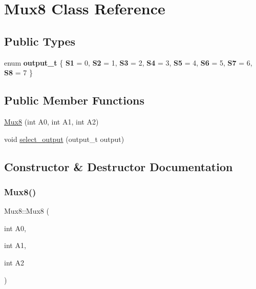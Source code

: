 \hypertarget{classMux8}{}\section{Mux8 Class Reference}
\label{classMux8}
\subsection*{Public Types}
\begin{DoxyCompactItemize}
\item 
\mbox{\label{classMux8_ad6d04bdd7e7e7bf1f8dd4744c3d0f909}} 
enum {\bfseries output\+\_\+t} \{ \newline
{\bfseries S1} = 0, 
{\bfseries S2} = 1, 
{\bfseries S3} = 2, 
{\bfseries S4} = 3, 
\newline
{\bfseries S5} = 4, 
{\bfseries S6} = 5, 
{\bfseries S7} = 6, 
{\bfseries S8} = 7
 \}
\end{DoxyCompactItemize}
\subsection*{Public Member Functions}
\begin{DoxyCompactItemize}
\item 
\hyperlink{classMux8_a7e27c07da5137ece0a9bc4734af9cfde}{Mux8} (int A0, int A1, int A2)
\item 
void \hyperlink{classMux8_a5346acad27b831b3b4e5b6b0914d725b}{select\+\_\+output} (output\+\_\+t output)
\end{DoxyCompactItemize}


\subsection{Constructor \& Destructor Documentation}
\mbox{\label{classMux8_a7e27c07da5137ece0a9bc4734af9cfde}} 
\subsubsection{\texorpdfstring{Mux8()}{Mux8()}}
{\footnotesize\ttfamily Mux8\+::\+Mux8 (\begin{DoxyParamCaption}\item[{int}]{A0,  }\item[{int}]{A1,  }\item[{int}]{A2 }\end{DoxyParamCaption})}

